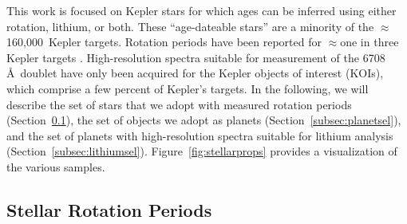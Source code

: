 \documentclass[11pt,twocolumn,tighten]{aastex63}
\newcommand{\nkeplerstars}{$\approx$160{,}000}
\begin{document}
This work is focused on Kepler stars for which ages can be inferred
using either rotation, lithium, or both.  These ``age-dateable stars''
are a minority of the \nkeplerstars\ Kepler targets.  Rotation periods
have been reported for $\approx$one in three Kepler targets
\citep[e.g.][]{McQuillan_2014,Santos_2021}.  High-resolution spectra
suitable for measurement of the  6708\,\AA\ doublet have
only been acquired for the Kepler objects of interest (KOIs), which
comprise a few percent of Kepler's targets.  In the following, we will
describe the set of stars that we adopt with measured rotation periods
(Section~\ref{subsec:rotsel}), the set of objects we adopt as planets
(Section~\ref{subsec:planetsel}), and the set of planets with
high-resolution spectra suitable for lithium analysis
(Section~\ref{subsec:lithiumsel}).  Figure~\ref{fig:stellarprops}
provides a visualization of the various samples.


\subsection{Stellar Rotation Periods}
\label{subsec:rotsel}


\begin{figure*}[!t]
	\begin{center}
	\end{center}
	\vspace{-0.5cm}
	\caption{
    {\bf Rotation periods for Kepler target stars (left) and known
    planet hosts (right)}.  
    The gray lines are ``mean fits'' to the slow rotation sequences of
    open clusters.  The stellar sample (left) includes only apparently
    single stars near the main sequence with $\log g$$>$4.2,
    RUWE$<$1.4, and temperatures of 3800--6200\,K.  The color map has
    a linear stretch.  The planet-hosts (right) require the same
    stellar cuts, and include only the confirmed and candidate planets
    described in Section~\ref{subsec:plflags}.  An order of magnitude
    estimate for the number of young planets discovered by Kepler
    follows by counting planets below the mean rotational isochrones.
	}
	\label{fig:prot_vs_teff}
\end{figure*}
\end{document}

